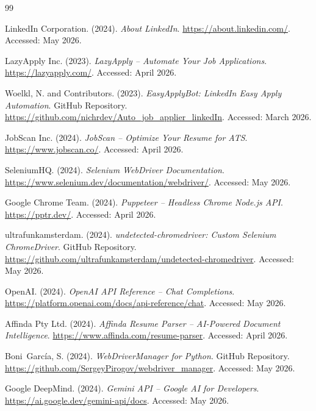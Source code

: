 \documentclass[12pt, a4paper, oneside]{report}
\begin{document}

\begin{thebibliography}{99}

LinkedIn Corporation. (2024). \textit{About LinkedIn}.
\url{https://about.linkedin.com/}. Accessed: May 2026.

LazyApply Inc. (2023). \textit{LazyApply -- Automate Your Job Applications}.
\url{https://lazyapply.com/}. Accessed: April 2026.

Woelkl, N. and Contributors. (2023). \textit{EasyApplyBot: LinkedIn Easy Apply Automation}.
GitHub Repository. \url{https://github.com/nichrdev/Auto_job_applier_linkedIn}. Accessed: March 2026.

JobScan Inc. (2024). \textit{JobScan -- Optimize Your Resume for ATS}.
\url{https://www.jobscan.co/}. Accessed: April 2026.

SeleniumHQ. (2024). \textit{Selenium WebDriver Documentation}.
\url{https://www.selenium.dev/documentation/webdriver/}. Accessed: May 2026.

Google Chrome Team. (2024). \textit{Puppeteer -- Headless Chrome Node.js API}.
\url{https://pptr.dev/}. Accessed: April 2026.

ultrafunkamsterdam. (2024). \textit{undetected-chromedriver: Custom Selenium ChromeDriver}.
GitHub Repository. \url{https://github.com/ultrafunkamsterdam/undetected-chromedriver}. Accessed: May 2026.

OpenAI. (2024). \textit{OpenAI API Reference -- Chat Completions}.
\url{https://platform.openai.com/docs/api-reference/chat}. Accessed: May 2026.

Affinda Pty Ltd. (2024). \textit{Affinda Resume Parser -- AI-Powered Document Intelligence}.
\url{https://www.affinda.com/resume-parser}. Accessed: April 2026.

Boni~Garc\'ia, S. (2024). \textit{WebDriverManager for Python}.
GitHub Repository. \url{https://github.com/SergeyPirogov/webdriver_manager}. Accessed: May 2026.

Google DeepMind. (2024). \textit{Gemini API -- Google AI for Developers}.
\url{https://ai.google.dev/gemini-api/docs}. Accessed: May 2026.


\end{thebibliography}
\end{document}
